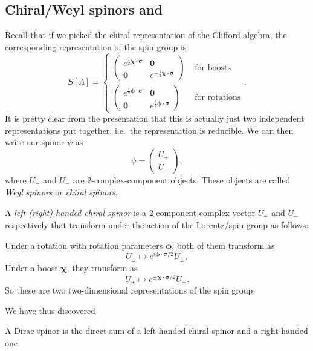 \documentclass[a4paper]{article}
\begin{document}
\subsection{Chiral/Weyl spinors and }
Recall that if we picked the chiral representation of the Clifford algebra, the corresponding representation of the spin group is
\[
  S[\Lambda] =
  \begin{cases}
    \begin{pmatrix}
      e^{\frac{1}{2}\boldsymbol\chi\cdot \boldsymbol\sigma} & \mathbf{0}\\
      \mathbf{0} & e^{-\frac{1}{2} \boldsymbol\chi \cdot \boldsymbol\sigma}
    \end{pmatrix}& \text{ for boosts}\\[11pt]
    \begin{pmatrix}
      e^{\frac{i}{2}\boldsymbol\phi\cdot \boldsymbol\sigma} & \mathbf{0}\\
      \mathbf{0} & e^{\frac{i}{2} \boldsymbol\phi \cdot \boldsymbol\sigma}
    \end{pmatrix}& \text{ for rotations}
  \end{cases}.
\]
It is pretty clear from the presentation that this is actually just two independent representations put together, i.e.\ the representation is reducible. We can then write our spinor $\psi$ as
\[
  \psi=
  \begin{pmatrix}
    U_+\\ U_-
  \end{pmatrix},
\]
where $U_+$ and $U_-$ are 2-complex-component objects. These objects are called \emph{Weyl spinors} or \emph{chiral spinors}.
\begin{defi}
  A \emph{left (right)-handed chiral spinor} is a 2-component complex vector $U_+$ and $U_-$ respectively that transform under the action of the Lorentz/spin group as follows:

  Under a rotation with rotation parameters $\boldsymbol\phi$, both of them transform as
  \[
    U_\pm \mapsto e^{i \boldsymbol\phi \cdot \boldsymbol\sigma/2} U_\pm,
  \]
  Under a boost $\boldsymbol\chi$, they transform as
  \[
    U_{\pm} \mapsto e^{\pm \boldsymbol\chi\cdot \boldsymbol\sigma/2} U_{\pm}.
  \]
  So these are two two-dimensional representations of the spin group.
\end{defi}
We have thus discovered
\begin{prop}
  A Dirac spinor is the direct sum of a left-handed chiral spinor and a right-handed one.
\end{prop}
\end{document}
